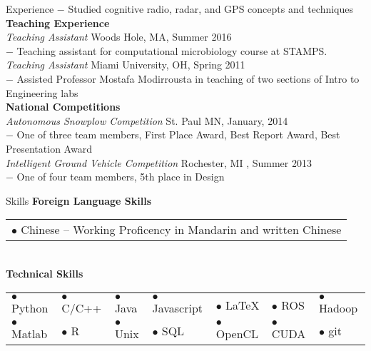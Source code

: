 \documentclass{resume} %
\begin{document}
\begin{rSection}{Experience}
  $-$ Studied cognitive radio, radar, and GPS concepts and techniques \\[3 mm]
%
  \textbf{Teaching Experience}\\
  \textit{Teaching Assistant} \hfill Woods Hole, MA, Summer 2016 \\
  $-$ Teaching assistant for computational microbiology course at STAMPS.\\
  \textit{Teaching Assistant} \hfill Miami University, OH, Spring 2011 \\
  $-$ Assisted Professor Mostafa Modirrousta in teaching of two sections of Intro to Engineering labs\\[3 mm]
%
  \textbf{National Competitions}\\
  \textit{Autonomous Snowplow Competition} \hfill St. Paul MN, January, 2014 \\
  $-$ One of three team members, First Place Award, Best Report Award, Best Presentation Award\\
  \textit{Intelligent Ground Vehicle Competition} \hfill Rochester, MI , Summer 2013 \\
  $-$ One of four team members, 5th place in Design
\end{rSection}
\begin{rSection}{Skills}
  \textbf{Foreign Language Skills}\\[1 mm]
  \begin{tabular}{l}
    $\bullet$ Chinese --  Working Proficency in Mandarin and written Chinese\\
  \end{tabular}\\
  \textbf{Technical Skills}\\[1 mm]
  \begin{tabular}{lllllll}
     $\bullet$ Python   &  $\bullet$ C/C++ &  $\bullet$ Java  & $\bullet$ Javascript &  $\bullet$ \LaTeX   &  $\bullet$ ROS    &  $\bullet$ Hadoop\\
     $\bullet$ Matlab   &  $\bullet$ R     &  $\bullet$ Unix   & $\bullet$ SQL      &  $\bullet$ OpenCL   &  $\bullet$ CUDA   &   $\bullet$ git\\
  \end{tabular}\\[1 mm]
\end{rSection}
\end{document}
